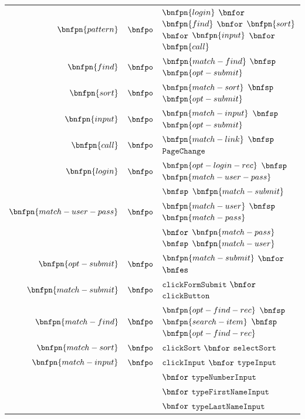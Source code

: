 \documentclass[conference]{IEEEtran}
\begin{document}
\begin{table}[!htb]
\begin{tabular}{rcl}
  $\bnfpn{pattern}$ & $\bnfpo$ & $\bnfpn{login}$ $\bnfor$ $\bnfpn{find}$ $\bnfor$ $\bnfpn{sort}$ $\bnfor$ $\bnfpn{input}$ $\bnfor$ $\bnfpn{call}$ \\
  
  $\bnfpn{find}$  & $\bnfpo$ &  $\bnfpn{match-find}$ $\bnfsp$ $\bnfpn{opt-submit}$ \\
  
  $\bnfpn{sort}$ & $\bnfpo$ &  $\bnfpn{match-sort}$ $\bnfsp$ $\bnfpn{opt-submit}$ \\
  
  $\bnfpn{input}$ & $\bnfpo$ &  $\bnfpn{match-input}$ $\bnfsp$ $\bnfpn{opt-submit}$ \\
  
  $\bnfpn{call}$ & $\bnfpo$ &  $\bnfpn{match-link}$ $\bnfsp$ $\texttt{PageChange}$ \\
  
  $\bnfpn{login}$ & $\bnfpo$ &  $\bnfpn{opt-login-rec}$ $\bnfsp$ $\bnfpn{match-user-pass}$\\
  & & $\bnfsp$ $\bnfpn{match-submit}$ \\
  
  $\bnfpn{match-user-pass}$ & $\bnfpo$ &  $\bnfpn{match-user}$ $\bnfsp$ $\bnfpn{match-pass}$ \\
  & & $\bnfor$ $\bnfpn{match-pass}$ $\bnfsp$ $\bnfpn{match-user}$ \\
  
  $\bnfpn{opt-submit}$ & $\bnfpo$ &  $\bnfpn{match-submit}$ $\bnfor$ $\bnfes$ \\
  
  $\bnfpn{match-submit}$ & $\bnfpo$ &  $\texttt{clickFormSubmit}$ $\bnfor$ $\texttt{clickButton}$ \\
  
  $\bnfpn{match-find}$ & $\bnfpo$ &  $\bnfpn{opt-find-rec}$ $\bnfsp$ $\bnfpn{search-item}$ $\bnfsp$ $\bnfpn{opt-find-rec}$ \\
  
  $\bnfpn{match-sort}$ & $\bnfpo$ &  $\texttt{clickSort}$ $\bnfor$ $\texttt{selectSort}$ \\
  
  $\bnfpn{match-input}$ & $\bnfpo$ &  $\texttt{clickInput}$ $\bnfor$ $\texttt{typeInput}$ \\
  & & $\bnfor$ $\texttt{typeNumberInput}$ \\ 
  & & $\bnfor$ $\texttt{typeFirstNameInput}$ \\
  & & $\bnfor$ $\texttt{typeLastNameInput}$ \\
  

\end{tabular}
\end{table}
\end{document}
